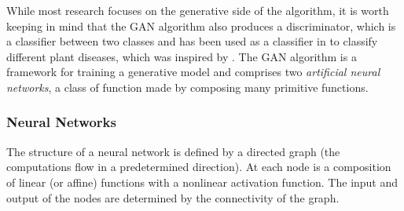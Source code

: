 While most research focuses on the generative side of the algorithm,
it is worth keeping in mind that the GAN algorithm also produces a
discriminator, which is a classifier between two classes and has been
used as a classifier in \cite{ref:cortes-2017} to classify different
plant diseases, which was inspired by \cite{ref:odena-2016}.  The GAN
algorithm is a framework for training a generative model and comprises
two \textit{artificial neural networks}, a class of function made by
composing many primitive functions.

\subsubsection*{Neural Networks}

The structure of a neural network is defined by a directed graph (the
computations flow in a predetermined direction). At each node is a
composition of linear (or affine) functions with a nonlinear
activation function. The input and output of the nodes are determined
by the connectivity of the graph.

